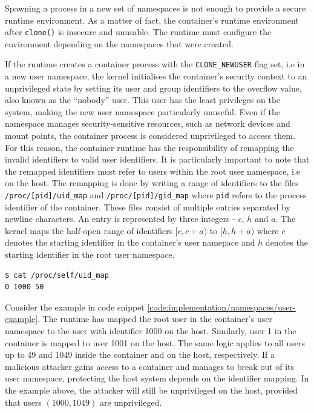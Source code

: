 Spawning a process in a new set of namespaces is not enough to provide a secure runtime environment.
As a matter of fact, the container's runtime environment after \verb|clone()| is insecure and unusable.
The runtime must configure the environment depending on the namespaces that were created.

If the runtime creates a container process with the \verb|CLONE_NEWUSER| flag set, i.e in a new user namespace,
the kernel initialises the container's security context to an unprivileged state by setting its 
user and group identifiers to the overflow value, also known as the \enquote{nobody} user.
This user has the least privileges on the system, making the new user namespace particularly unuseful. 
Even if the namespace manages security-sensitive resources, such as network devices and mount points,
the container process is considered unprivileged to access them. For this reason, the container runtime 
has the responsibility of remapping the invalid identifiers to valid user identifiers. 
It is particularly important to note that the remapped identifiers must refer to users within 
the root user namespace, i.e on the host. The remapping is done by writing a range of 
identifiers to the files \verb|/proc/[pid]/uid_map| and \verb|/proc/[pid]/gid_map| where \verb|pid|
refers to the process identifier of the container.
These files consist of multiple entries separated by newline characters. 
An entry is represented by three integers - $c$, $h$ and $a$. 
The kernel maps the half-open range of identifiers $[c, c+a)$ to $[h, h+a)$ where 
$c$ denotes the starting identifier in the container's user namepace and $h$ denotes 
the starting identifier in the root user namespace.
\begin{lstlisting}[label={code:implementation/namespaces/user-example}, style=bash, caption={Example of an identifier mapping}]
$ cat /proc/self/uid_map
0 1000 50
\end{lstlisting}
Consider the example in code snippet \ref{code:implementation/namespaces/user-example}. The 
runtime has mapped the root user in the container's user namespace to the user with identifier 1000 
on the host. Similarly, user 1 in the container is mapped to user 1001 on the host. The same logic 
applies to all users up to 49 and 1049 inside the container and on the host, respectively. 
If a malicious attacker gains access to a container and manages to break out of its user namespace, 
protecting the host system depends on the identifier mapping. In the example above, the 
attacker will still be unprivileged on the host, provided that users $(1000, 1049)$ are unprivileged.

